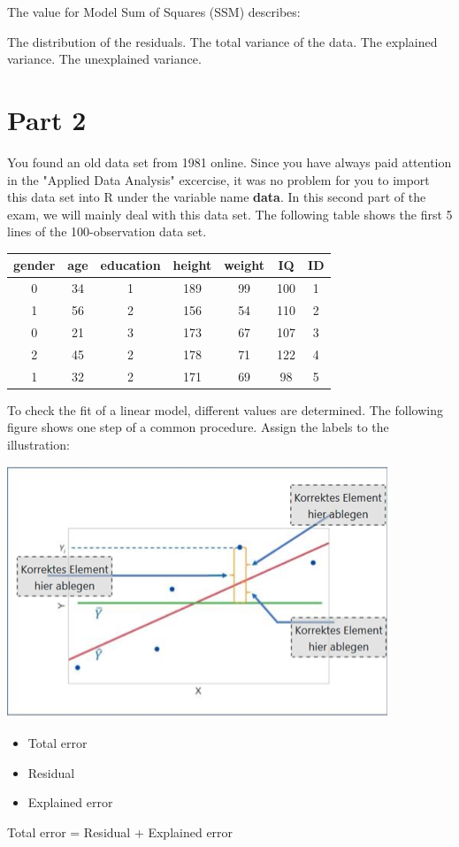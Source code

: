 \documentclass[addpoints]{exam}
\begin{document}
\begin{questions}
		\question[1] The value for Model Sum of Squares (SSM) describes:
		\begin{checkboxes}
			\choice The distribution of the residuals.
			\CorrectChoice The total variance of the data.
			\choice The explained variance.
			\choice The unexplained variance.
		\end{checkboxes}
	
		\section*{Part 2}
		You found an old data set from 1981 online. Since you have always paid attention in the "Applied Data Analysis" excercise, it was no problem for you to import this data set into R under the variable name \textbf{data}. In this second part of the exam, we will mainly deal with this data set. The following table shows the first 5 lines of the 100-observation data set.
		\begin{center}
			\begin{tabular}{c|c|c|c|c|c|c}
				\textbf{gender} & \textbf{age} & \textbf{education} & \textbf{height} & \textbf{weight} & \textbf{IQ} & \textbf{ID} \\
				\hline
				0 & 34 & 1 & 189 & 99 & 100 & 1 \\
				1 & 56 & 2 & 156 & 54 & 110 & 2 \\
				0 & 21 & 3 & 173 & 67 & 107 & 3 \\
				2 & 45 & 2 & 178 & 71 & 122 & 4 \\
				1 & 32 & 2 & 171 & 69 & 98 & 5
			\end{tabular}
		\end{center}
	
		\question[1\half] To check the fit of a linear model, different values are determined. The following figure shows one step of a common procedure. Assign the labels to the illustration:
		\begin{center}
			\includegraphics[scale=0.5]{errrorsplit.png}
		\end{center}
		\begin{itemize}
			\item Total error
			\item Residual
			\item Explained error
		\end{itemize} 
		\begin{solution}
			Total error = Residual + Explained error
		\end{solution}
	

\end{questions}
\end{document}
